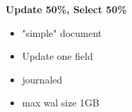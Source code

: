\documentclass[usenames,dvipsnames, 18pt, compress, aspectratio=169]{beamer}
\begin{document}



\begin{frame}
    \frametitle{}
    \begin{center}
        \textbf{Update 50\%, Select 50\%}
        \begin{itemize}[label={}]
            \item "simple" document
            \item Update one field
            \item journaled
            \item max wal size 1GB
        \end{itemize}
    \end{center}
\end{frame}

\end{document}
